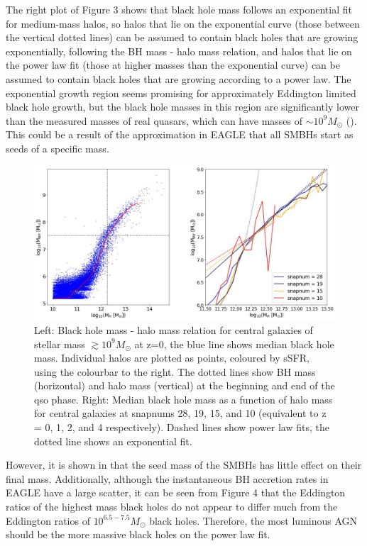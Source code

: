 \documentclass[12pt, twocolumn]{report}%
\begin{document}
The right plot of Figure 3 shows that black hole mass follows an exponential fit for medium-mass halos, so halos that lie on the exponential curve (those between the vertical dotted lines) can be assumed to contain black holes that are growing exponentially, following the BH mass - halo mass relation, and halos that lie on the power law fit (those at higher masses than the exponential curve) can be assumed to contain black holes that are growing according to a power law. The exponential growth region seems promising for approximately Eddington limited black hole growth, but the black hole masses in this region are significantly lower than the measured masses of real quasars, which can have masses of $\sim10^9M_\odot$ (\cite{Marshall}). This could be a result of the approximation in EAGLE that all SMBHs start as seeds of a specific mass.

\onecolumngrid


\begin{figure}[H]
\centering
\includegraphics[width=17cm]{Plot_3.jpeg}
\caption{Left: Black hole mass - halo mass relation for central galaxies of stellar mass $\gtrsim10^9M_\odot$ at z=0, the blue line shows median black hole mass. Individual halos are plotted as points, coloured by sSFR, using the colourbar to the right. The dotted lines show BH mass (horizontal) and halo mass (vertical) at the beginning and end of the qso phase. Right: Median black hole mass as a function of halo mass for central galaxies at snapnums 28, 19, 15, and 10 (equivalent to z = 0, 1, 2, and 4 respectively). Dashed lines show power law fits, the dotted line shows an exponential fit.}
\label{fig:3}
\end{figure}
\twocolumngrid


 \noindent However, it is shown in \cite{Quasar} that the seed mass of the SMBHs has little effect on their final mass. Additionally, although the instantaneous BH accretion rates in EAGLE have a large scatter, it can be seen from Figure 4 that the Eddington ratios of the highest mass black holes do not appear to differ much from the Eddington ratios of $10^{6.5-7.5}M_\odot$ black holes. Therefore, the most luminous AGN should be the more massive black holes on the power law fit.\par
\end{document}
